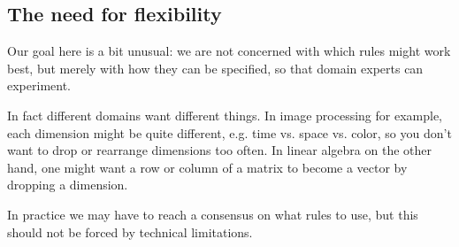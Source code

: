\documentclass[preprint]{sigplanconf}
\begin{document}


\subsection{The need for flexibility}

Our goal here is a bit unusual: we are not concerned with which rules might
work best, but merely with how they can be specified, so that domain experts
can experiment.

In fact different domains want different things. In image processing for
example, each dimension might be quite different, e.g. time vs. space vs. color,
so you don't want to drop or rearrange dimensions too often. In linear algebra
on the other hand, one might want a row or column of a matrix to become a vector
by dropping a dimension.

In practice we may have to reach a consensus on what rules to use, but this
should not be forced by technical limitations.



\end{document}
